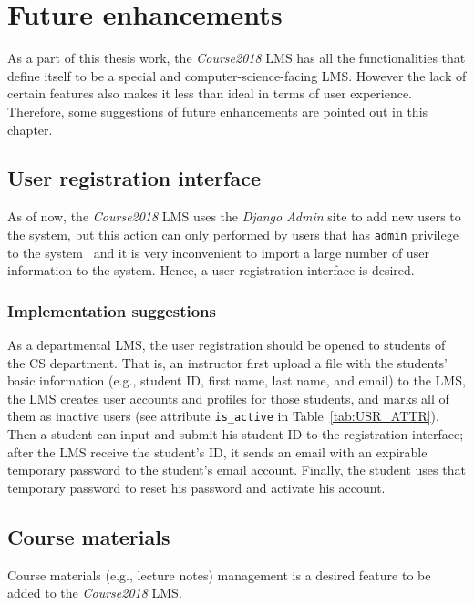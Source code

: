 

\chapter{Future enhancements}
\label{chap:FUTURE}

As a part of this thesis work, 
the \emph{Course2018} LMS has all the functionalities that define itself
to be a special and computer-science-facing LMS.
However the lack of certain features also makes it less than ideal in terms
of user experience.
Therefore, some suggestions of future enhancements are pointed out in this
chapter.

\section{User registration interface}
As of now, the \emph{Course2018} LMS uses the \emph{Django Admin} site to
add new users to the system, but this action can only performed by users that
has \texttt{admin} privilege to the system~\cite{djangoAdmin} and it is very
inconvenient to import a large number of user information to the system.
Hence, a user registration interface is desired.

\subsection{Implementation suggestions}
As a departmental LMS, the user registration should be opened to students
of the CS department.
That is, an instructor first upload a file with the students' basic information
(e.g., student ID, first name, last name, and email) to the LMS, the LMS
creates user accounts and profiles for those students, and marks all of them
as inactive users (see attribute \texttt{is\_active} in
Table~\ref{tab:USR_ATTR}).
Then a student can input and submit his student ID to the registration
interface; after the LMS receive the student's ID,
it sends an email with an expirable temporary password to the student's
email account.
Finally, the student uses that temporary password to reset his password and
activate his account.

\section{Course materials}
Course materials (e.g., lecture notes) management is a desired feature to be
added to the \emph{Course2018} LMS.

